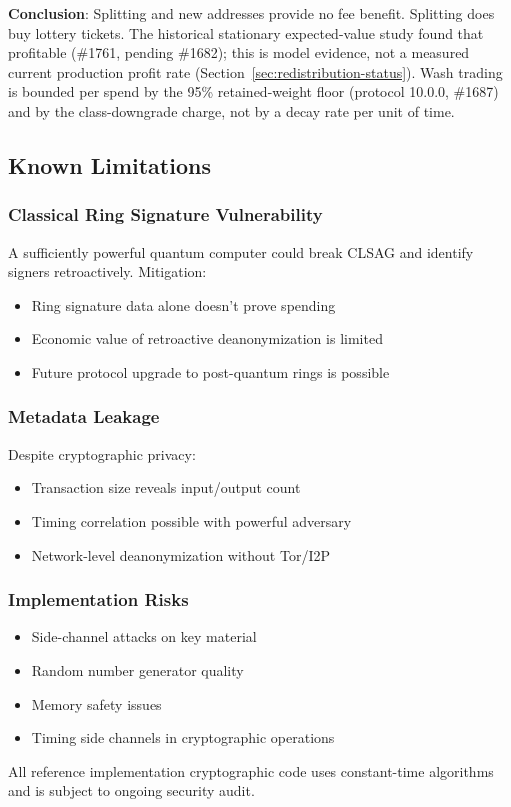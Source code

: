 \textbf{Conclusion}: Splitting and new addresses provide no fee benefit.
Splitting does buy lottery tickets. The historical stationary expected-value
study found that profitable (\#1761, pending \#1682); this is model evidence,
not a measured current production profit rate
(Section~\ref{sec:redistribution-status}). Wash
trading is bounded per spend by the 95\% retained-weight floor (protocol
10.0.0, \#1687) and by the class-downgrade charge, not by a decay rate per
unit of time.

\subsection{Known Limitations}

\subsubsection{Classical Ring Signature Vulnerability}

A sufficiently powerful quantum computer could break CLSAG and identify
signers retroactively. Mitigation:
\begin{itemize}
  \item Ring signature data alone doesn't prove spending
  \item Economic value of retroactive deanonymization is limited
  \item Future protocol upgrade to post-quantum rings is possible
\end{itemize}

\subsubsection{Metadata Leakage}

Despite cryptographic privacy:
\begin{itemize}
  \item Transaction size reveals input/output count
  \item Timing correlation possible with powerful adversary
  \item Network-level deanonymization without Tor/I2P
\end{itemize}

\subsubsection{Implementation Risks}

\begin{itemize}
  \item Side-channel attacks on key material
  \item Random number generator quality
  \item Memory safety issues
  \item Timing side channels in cryptographic operations
\end{itemize}

All reference implementation cryptographic code uses constant-time
algorithms and is subject to ongoing security audit.

